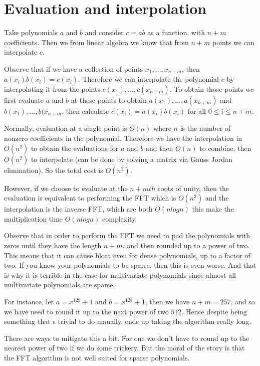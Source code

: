 \chapter{Evaluation and interpolation}\label{chapter1}

Take polynomials $a$ and $b$ and consider $c = ab$ as a function, with $n + m$ coefficients. Then we from linear algebra we know that from $n + m$ points we can interpolate $c$.

Observe that if we have a collection of points $x_1, \ldots, x_{n+m}$, then $a(x_i)b(x_i) = c(x_i)$. Therefore we can interpolate the polynomial $c$ by interpolating it from the points $c(x_1), \ldots, c(x_{n+m})$. To obtain those points we first evaluate $a$ and $b$ at these points to obtain $a(x_1), \ldots, a(x_{n+m})$ and $b(x_1), \ldots, b(x_{n+m}$, then calculate $c(x_i) = a(x_i)b(x_i)$ for all $0 \leq i \leq n + m$.

Normally, evaluation at a single point is $O(n)$ where $n$ is the number of nonzero coefficients in the polynomial. Therefore we have the interpolation in $O(n^2)$ to obtain the evaluations for $a$ and $b$ and then $O(n)$ to combine, then $O(n^2)$ to interpolate (can be done by solving a matrix via Gauss Jordan elimination). So the total cost is $O(n^2)$.

However, if we choose to evaluate at the $n + mth$ roots of unity, then the evaluation is equivalent to performing the FFT which is $O(n^2)$ and the interpolation is the inverse FFT, which are both $O(nlog n)$ this make the multiplication time $O(n log n)$ complexity.

Observe that in order to perform the FFT we need to pad the polynomials with zeros until they have the length $n + m$, and then rounded up to a power of two. This means that it can cause bloat even for dense polynomials, up to a factor of two. If you know your polynomials to be sparse, then this is even worse. And that is why it is terrible in the case for multivariate polynomials since almost all multivariate polynomials are sparse.

For instance, let $a = x^{129} + 1$ and $b = x^{128} + 1$, then we have $n + m = 257$, and so we have need to round it up to the next power of two $512$. Hence despite being something that s trivial to do maually, ends up taking the algorithm really long.

There are ways to mitigate this a bit. For one we don't have to round up to the nearest power of two if we do some trickery. But the moral of the story is that the FFT algorithm is not well suited for sparse polynomials.

